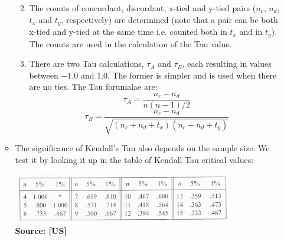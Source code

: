 \begin{itemize}
\begin{itemize}
\begin{enumerate}
{\begin{tabular}{ll}
      \end{tabular}}
    \oneex
    \item The counts of concordant, discordant, x-tied and y-tied pairs ($n_c$, $n_d$, $t_x$ and $t_y$, respectively) are determined (note that a pair can be both x-tied and y-tied at the same time i.e. counted both in $t_x$ and in $t_y$). The counts are used in the calculation of the Tau value.
    \item There are two Tau calculations, $\tau_A$ and $\tau_B$, each resulting in values between $-1.0$ and 1.0. The former is simpler and is used when there are no ties. The Tau forumalae are:
    $$ \tau_A = \dfrac{n_c - n_d}{n(n-1)/2}$$
    $$ \tau_B = \dfrac{n_c - n_d}{\sqrt{(n_c+n_d+t_x)(n_c+n_d+t_y)}}$$
  \end{enumerate}

\item The significance of Kendall's Tau also depends on the sample size. We test it by looking it up in the table of Kendall Tau critical values:

      \includegraphics[width=0.8\textwidth]{2_1_1_tau_significance_table.png}\\ [-1.5ex] 
      {\fontsize{10}{0}\selectfont \textbf{Source: [US]}}
  \end{itemize}
  \newpage


\end{itemize}
